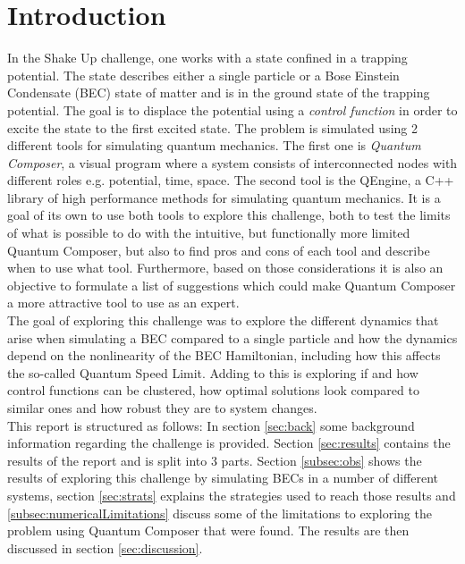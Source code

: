 \documentclass[a4paper, twocolumn]{revtex4-1}
\begin{document}
\section{Introduction}
In the Shake Up challenge, one works with a state confined in a trapping potential. The state describes either a single particle or a Bose Einstein Condensate (BEC) state of matter and is in the ground state of the trapping potential. The goal is to displace the potential using a \textit{control function} in order to excite the state to the first excited state. The problem is simulated using 2 different tools for simulating quantum mechanics. The first one is \textit{Quantum Composer}, a visual program where a system consists of interconnected nodes with different roles e.g. potential, time, space. The second tool is the QEngine, a C++ library of high performance methods for simulating quantum mechanics. It is a goal of its own to use both tools to explore this challenge, both to test the limits of what is possible to do with the intuitive, but functionally more limited Quantum Composer, but also to find pros and cons of each tool and describe when to use what tool. Furthermore, based on those considerations it is also an objective to formulate a list of suggestions which could make Quantum Composer a more attractive tool to use as an expert.\\

The goal of exploring this challenge was to explore the different dynamics that arise when simulating a BEC compared to a single particle and how the dynamics depend on the nonlinearity of the BEC Hamiltonian, including how this affects the so-called Quantum Speed Limit. Adding to this is exploring if and how control functions can be clustered, how optimal solutions look compared to similar ones and how robust they are to system changes.\\

This report is structured as follows: In section \ref{sec:back} some background information regarding the challenge is provided. Section \ref{sec:results} contains the results of the report and is split into 3 parts. Section \ref{subsec:obs} shows the results of exploring this challenge by simulating BECs in a number of different systems, section \ref{sec:strats} explains the strategies used to reach those results and \ref{subsec:numericalLimitations} discuss some of the limitations to exploring the problem using Quantum Composer that were found. The results are then discussed in section \ref{sec:discussion}.
\end{document}
